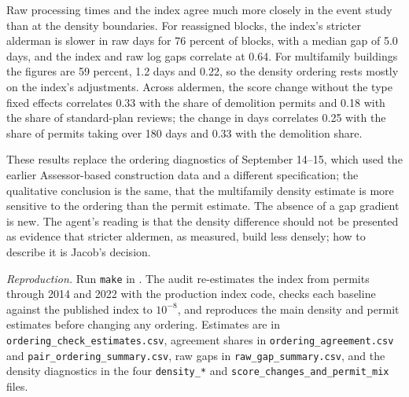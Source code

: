 Raw processing times and the index agree much more closely in the event study than at the density boundaries. For
reassigned blocks, the index's stricter alderman is slower in raw days for 76 percent of blocks, with a median gap of
5.0 days, and the index and raw log gaps correlate at 0.64. For multifamily buildings the figures are 59 percent, 1.2
days and 0.22, so the density ordering rests mostly on the index's adjustments. Across aldermen, the score change
without the type fixed effects correlates 0.33 with the share of demolition permits and 0.18 with the share of
standard-plan reviews; the change in days correlates 0.25 with the share of permits taking over 180 days and 0.33
with the demolition share.

These results replace the ordering diagnostics of September 14--15, which used the earlier Assessor-based
construction data and a different specification; the qualitative conclusion is the same, that the multifamily
density estimate is more sensitive to the ordering than the permit estimate. The absence of a gap gradient is new.
The agent's reading is that the density difference should not be presented as evidence that stricter aldermen, as
measured, build less densely; how to describe it is Jacob's decision.

\textit{Reproduction.} Run \texttt{make} in . The audit
re-estimates the index from permits through 2014 and 2022 with the production index code, checks each baseline
against the published index to $10^{-8}$, and reproduces the main density and permit estimates before changing any
ordering. Estimates are in \texttt{ordering\_check\_estimates.csv}, agreement shares in
\texttt{ordering\_agreement.csv} and \texttt{pair\_ordering\_summary.csv}, raw gaps in
\texttt{raw\_gap\_summary.csv}, and the density diagnostics in the four \texttt{density\_*} and
\texttt{score\_changes\_and\_permit\_mix} files.

